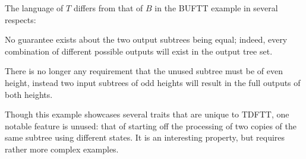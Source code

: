 The language of $T$ differs from that of $B$ in the BUFTT example in
several respects:
\begin{compactitem}
\item No guarantee exists about the two output subtrees being equal;
indeed, every combination of different possible outputs will exist in the
output tree set.
\item There is no longer any requirement that the unused subtree must be of
even height, instead two input subtrees of odd heights will result in the
full outputs of both heights.
\end{compactitem}

Though this example showcases several traits that are unique to TDFTT, one
notable feature is unused: that of starting off the processing of two
copies of the same subtree using different states. It is an interesting
property, but requires rather more complex examples.

